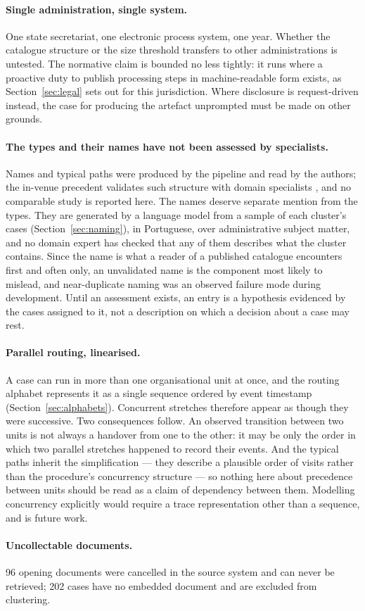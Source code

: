 \paragraph{Single administration, single system.}
One state secretariat, one electronic process system, one year. Whether the catalogue structure
or the size threshold transfers to other administrations is untested. The normative claim is
bounded no less tightly: it runs where a proactive duty to publish processing steps in
machine-readable form exists, as Section~\ref{sec:legal} sets out for this jurisdiction. Where
disclosure is request-driven instead, the case for producing the artefact unprompted must be
made on other grounds.

\paragraph{The types and their names have not been assessed by specialists.}
Names and typical paths were produced by the pipeline and read by the authors; the in-venue
precedent validates such structure with domain specialists \citep{vianna2024topic}, and no
comparable study is reported here. The names deserve separate mention from the types. They are
generated by a language model from a sample of each cluster's cases (Section~\ref{sec:naming}),
in Portuguese, over administrative subject matter, and no domain expert has checked that any of
them describes what the cluster contains. Since the name is what a reader of a published
catalogue encounters first and often only, an unvalidated name is the component most likely to
mislead, and near-duplicate naming was an observed failure mode during development. Until an
assessment exists, an entry is a hypothesis evidenced by the cases assigned to it, not a
description on which a decision about a case may rest.

\paragraph{Parallel routing, linearised.}
A case can run in more than one organisational unit at once, and the routing alphabet represents
it as a single sequence ordered by event timestamp (Section~\ref{sec:alphabets}). Concurrent
stretches therefore appear as though they were successive. Two consequences follow. An observed
transition between two units is not always a handover from one to the other: it may be only the
order in which two parallel stretches happened to record their events. And the typical paths
inherit the simplification --- they describe a plausible order of visits rather than the
procedure's concurrency structure --- so nothing here about precedence between units should be
read as a claim of dependency between them. Modelling concurrency explicitly would require a
trace representation other than a sequence, and is future work.

\paragraph{Uncollectable documents.}
96 opening documents were cancelled in the source system and can never be retrieved; 202 cases
have no embedded document and are excluded from clustering.
